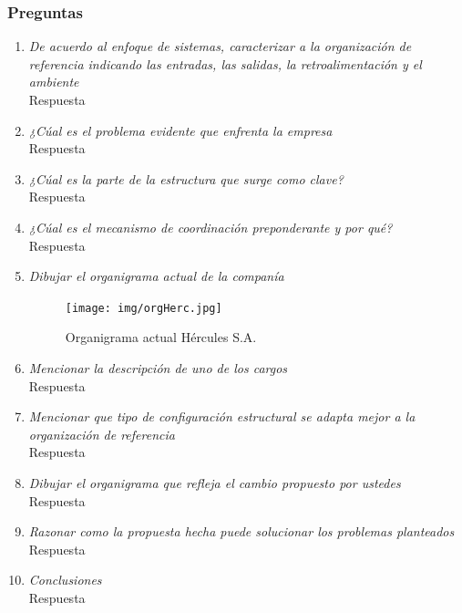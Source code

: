 \documentclass[a4paper,10pt]{article}
\begin{document}
		\subsubsection{Preguntas}
			\begin{enumerate}
		
			\item \textit{ De acuerdo al enfoque de sistemas, caracterizar a la organización de referencia indicando las entradas, las salidas, la retroalimentación y el ambiente}\\
			Respuesta		
			
			\item \textit{¿Cúal es el problema evidente que enfrenta la empresa}\\
			Respuesta			
			
			\item \textit{¿Cúal es la parte de la estructura que surge como clave?}\\
			Respuesta
			
			\item \textit{¿Cúal es el mecanismo de coordinación preponderante y por qué?}\\
			Respuesta
						
			\item \textit{Dibujar el organigrama actual de la companía}\\
				\begin{figure}[H]
					\centering
					\texttt{[image: img/orgHerc.jpg]}
					\caption{Organigrama actual Hércules S.A.}
				\end{figure}
						
			\item \textit{Mencionar la descripción de uno de los cargos}\\
			Respuesta
						
			\item \textit{Mencionar que tipo de configuración estructural se adapta mejor a la organización de referencia}\\
			Respuesta
						
			\item \textit{Dibujar el organigrama que refleja el cambio propuesto por ustedes}\\
			Respuesta
						
			\item \textit{Razonar como la propuesta hecha puede solucionar los problemas planteados}\\
			Respuesta
			
			\item \textit{Conclusiones}\\
			Respuesta
			
			\end{enumerate}
\end{document}
